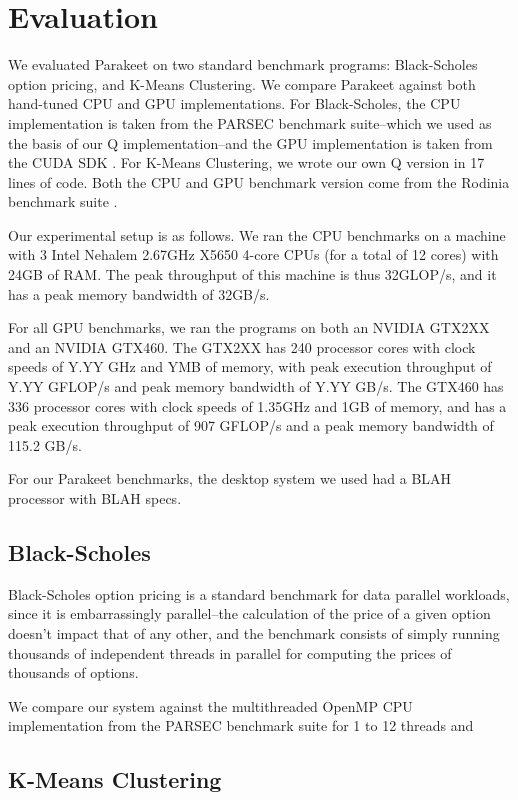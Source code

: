 \documentclass[preprint]{sigplanconf}
\begin{document}
\section{Evaluation}
\label{Evaluation}

We evaluated Parakeet on two standard benchmark programs: Black-Scholes option
pricing, and K-Means Clustering.  We compare Parakeet against both hand-tuned
CPU and GPU implementations.  For Black-Scholes, the CPU implementation is
taken from the PARSEC \cite{Bien08} benchmark suite--which we used as the basis
of our Q implementation--and the GPU implementation is taken from the CUDA SDK
\cite{NvidSD}.  For K-Means Clustering, we wrote our own Q version in 17 lines
of code.  Both the CPU and GPU benchmark version come from the Rodinia
benchmark suite \cite{Che09}.

Our experimental setup is as follows.  We ran the CPU benchmarks on a machine
with 3 Intel Nehalem 2.67GHz X5650 4-core CPUs (for a total of 12 cores) with
24GB of RAM.  The peak throughput of this machine is thus 32GLOP/s, and it has
a peak memory bandwidth of 32GB/s.

For all GPU benchmarks, we ran the programs on both an NVIDIA GTX2XX and an
NVIDIA GTX460.  The GTX2XX has 240 processor cores with clock speeds of
Y.YY GHz and YMB of memory, with peak execution throughput of Y.YY GFLOP/s and
peak memory bandwidth of Y.YY GB/s.  The GTX460 has 336 processor cores with
clock speeds of 1.35GHz and 1GB of memory, and has a peak execution throughput
of 907 GFLOP/s and a peak memory bandwidth of 115.2 GB/s.

For our Parakeet benchmarks, the desktop system we used had a BLAH processor
with BLAH specs.

\subsection{Black-Scholes}
Black-Scholes option pricing \cite{Blac73} is a standard benchmark for data
parallel workloads, since it is embarrassingly parallel--the calculation of the
price of a given option doesn't impact that of any other, and the benchmark
consists of simply running thousands of independent threads in parallel for
computing the prices of thousands of options.

We compare our system against the multithreaded OpenMP CPU implementation
from the PARSEC \cite{Bien08} benchmark suite for 1 to 12 threads and 

\subsection{K-Means Clustering}
\end{document}

